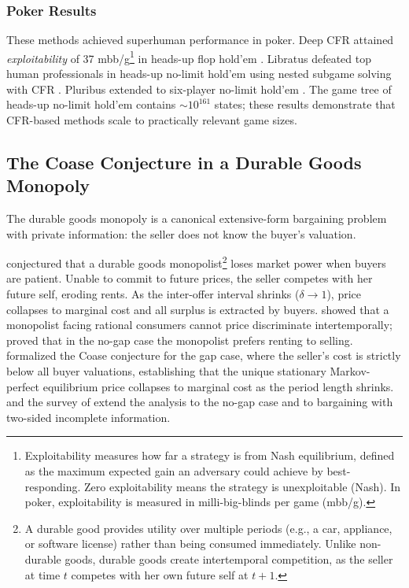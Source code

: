 \subsubsection{Poker Results}

These methods achieved superhuman performance in poker. Deep CFR attained \emph{exploitability} of 37 mbb/g\footnote{Exploitability measures how far a strategy is from Nash equilibrium, defined as the maximum expected gain an adversary could achieve by best-responding. Zero exploitability means the strategy is unexploitable (Nash). In poker, exploitability is measured in milli-big-blinds per game (mbb/g).} in heads-up flop hold'em \citep{Brown2019}. Libratus defeated top human professionals in heads-up no-limit hold'em using nested subgame solving with CFR \citep{brown2017superhuman}. Pluribus extended to six-player no-limit hold'em \citep{brown2019superhuman}. The game tree of heads-up no-limit hold'em contains $\sim 10^{161}$ states; these results demonstrate that CFR-based methods scale to practically relevant game sizes.

\subsection{The Coase Conjecture in a Durable Goods Monopoly}
\label{subsec:coase}

The durable goods monopoly is a canonical extensive-form bargaining problem with private information: the seller does not know the buyer's valuation.

\citet{coase1972durability} conjectured that a durable goods monopolist\footnote{A durable good provides utility over multiple periods (e.g., a car, appliance, or software license) rather than being consumed immediately. Unlike non-durable goods, durable goods create intertemporal competition, as the seller at time $t$ competes with her own future self at $t+1$.} loses market power when buyers are patient. Unable to commit to future prices, the seller competes with her future self, eroding rents. As the inter-offer interval shrinks ($\delta \to 1$), price collapses to marginal cost and all surplus is extracted by buyers. \citet{stokey1981rational} showed that a monopolist facing rational consumers cannot price discriminate intertemporally; \citet{bulow1982durable} proved that in the no-gap case the monopolist prefers renting to selling. \citet{gul1986foundations} formalized the Coase conjecture for the gap case, where the seller's cost is strictly below all buyer valuations, establishing that the unique stationary Markov-perfect equilibrium price collapses to marginal cost as the period length shrinks. \citet{ausubel1989reputation} and the survey of \citet{ausubel2002bargaining} extend the analysis to the no-gap case and to bargaining with two-sided incomplete information.

